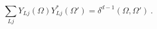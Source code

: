 \begin{equation}\label{complete}
\sum_{Lj}Y_{Lj}(\Omega)Y^*_{Lj}(\Omega')=
\delta^{d-1}(\Omega,\Omega') \ .
\end{equation}

